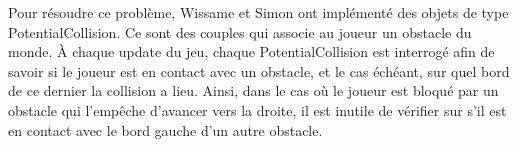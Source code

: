
Pour résoudre ce problème, Wissame et Simon ont implémenté des objets de type PotentialCollision.
Ce sont des couples qui associe au joueur un obstacle du monde. À chaque update du jeu, chaque PotentialCollision est interrogé afin de savoir si le joueur est en contact avec un obstacle, et le cas échéant, sur quel bord de ce dernier la collision a lieu.
\ml
Ainsi, dans le cas où le joueur est bloqué par un obstacle qui l'empêche d'avancer vers la  droite, il est inutile de vérifier sur s'il est en contact avec le bord gauche d'un autre obstacle.